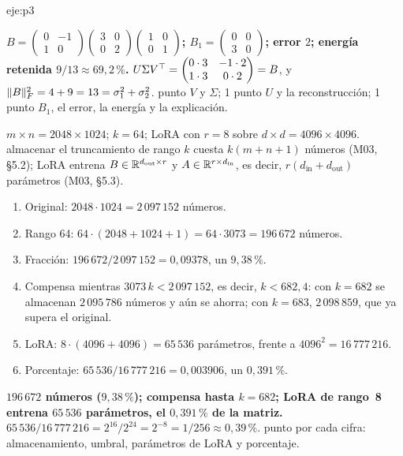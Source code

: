 \begin{solucion}{eje:p3}
\begin{enumerate}[label=\arabic*.]
\end{enumerate}
\resultado \textbf{$B=\begin{pmatrix}0&-1\\1&0\end{pmatrix}\begin{pmatrix}3&0\\0&2\end{pmatrix}\begin{pmatrix}1&0\\0&1\end{pmatrix}$; $B_1=\begin{pmatrix}0&0\\3&0\end{pmatrix}$; error $2$; energía retenida $9/13\approx 69{,}2\,\%$.}
\comprobacion $U\Sigma V^{\top}=\begin{pmatrix}0\cdot3&-1\cdot2\\1\cdot3&0\cdot2\end{pmatrix}=B$, y $\lVert B\rVert_F^{2}=4+9=13=\sigma_1^{2}+\sigma_2^{2}$.
 punto $V$ y $\Sigma$; 1 punto $U$ y la reconstrucción; 1 punto $B_1$, el error, la energía y la explicación.

\datos $m\times n=2048\times1024$; $k=64$; LoRA con $r=8$ sobre $d\times d=4096\times4096$.
\planteamiento almacenar el truncamiento de rango $k$ cuesta $k(m+n+1)$ números (M03, §5.2); LoRA entrena $B\in\mathbb{R}^{d_{\text{out}}\times r}$ y $A\in\mathbb{R}^{r\times d_{\text{in}}}$, es decir, $r(d_{\text{in}}+d_{\text{out}})$ parámetros (M03, §5.3).
\pasos
\begin{enumerate}[label=\arabic*.]
  \item Original: $2048\cdot1024=2\,097\,152$ números.
  \item Rango 64: $64\cdot(2048+1024+1)=64\cdot3073=196\,672$ números.
  \item Fracción: $196\,672/2\,097\,152=0{,}09378$, un $9{,}38\,\%$.
  \item Compensa mientras $3073\,k<2\,097\,152$, es decir, $k<682{,}4$: con $k=682$ se almacenan $2\,095\,786$ números y aún se ahorra; con $k=683$, $2\,098\,859$, que ya supera el original.
  \item LoRA: $8\cdot(4096+4096)=65\,536$ parámetros, frente a $4096^{2}=16\,777\,216$.
  \item Porcentaje: $65\,536/16\,777\,216=0{,}003906$, un $0{,}391\,\%$.
\end{enumerate}
\resultado \textbf{$196\,672$ números ($9{,}38\,\%$); compensa hasta $k=682$; LoRA de rango~8 entrena $65\,536$ parámetros, el $0{,}391\,\%$ de la matriz.}
\comprobacion $65\,536/16\,777\,216=2^{16}/2^{24}=2^{-8}=1/256\approx 0{,}39\,\%$.
 punto por cada cifra: almacenamiento, umbral, parámetros de LoRA y porcentaje.

\end{solucion}

